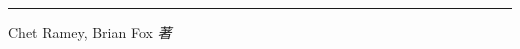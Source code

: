 \documentclass[openany,notitlepage]{book}
\begin{document}
\begin{CJK}{UTF8}{song}

\frontmatter
{}
\setcounter{page}{1}
\pagestyle{empty}

\begin{titlepage}
\
\end{titlepage}

\thispagestyle{empty}
\begin{center}\ \end{center}
\begin{center}
\vskip 10pt
\rule{.7\textwidth}{4pt}
\vskip 30pt
{\Large Chet Ramey, Brian Fox}  {\Large\textsl{著}}


\end{center}
\end{CJK}
\end{document}
